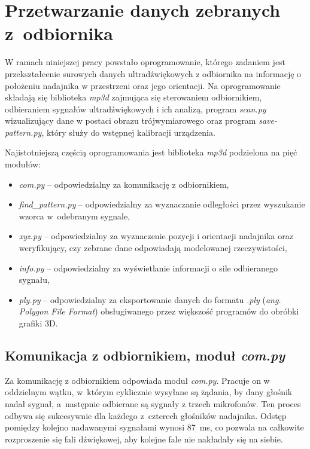 
\chapter{Przetwarzanie danych zebranych z~odbiornika}

W ramach niniejszej pracy powstało oprogramowanie, którego zadaniem jest
przekształcenie surowych danych ultradźwiękowych 
z odbiornika na informację o położeniu nadajnika w przestrzeni oraz jego orientacji.
Na oprogramowanie składają się biblioteka \textit{mp3d} zajmująca się
sterowaniem odbiornikiem, odbieraniem sygnałów ultradźwiękowych i ich analizą, program \textit{scan.py}
wizualizujący dane w postaci obrazu trójwymiarowego oraz program \textit{save-pattern.py},
który służy do wstępnej kalibracji urządzenia.

Najistotniejszą częścią oprogramowania jest biblioteka \textit{mp3d} podzielona na pięć modułów:
\begin{itemize}
 \item \textit{com.py} --  odpowiedzialny za komunikację z odbiornikiem,
 \item \textit{find\_pattern.py} --  odpowiedzialny za wyznaczanie odległości przez wyszukanie wzorca w~odebranym sygnale,
 \item \textit{xyz.py} --  odpowiedzialny za wyznaczenie pozycji i orientacji nadajnika oraz  weryfikujący, 
 czy zebrane dane odpowiadają modelowanej rzeczywistości,
 \item \textit{info.py} --  odpowiedzialny za wyświetlanie informacji o sile odbieranego sygnału,
 \item \textit{ply.py} --  odpowiedzialny za eksportowanie danych do formatu \textit{.ply}
    (\textit{ang. Polygon File Format}) obsługiwanego przez większość programów do obróbki grafiki 3D.
\end{itemize}


\section{Komunikacja z odbiornikiem, moduł \textit{com.py}}

Za komunikację z odbiornikiem odpowiada moduł \textit{com.py}.
Pracuje on w oddzielnym wątku, w~którym cyklicznie wysyłane są żądania, by dany głośnik nadał sygnał,
a~następnie odbierane są sygnały z trzech mikrofonów.
Ten proces odbywa się sukcesywnie dla każdego z~czterech głośników nadajnika.
Odstęp pomiędzy kolejno nadawanymi sygnałami wynosi \SI{87}{ms},
co pozwala na całkowite rozproszenie się fali dźwiękowej, aby kolejne fale nie nakładały się na siebie.

